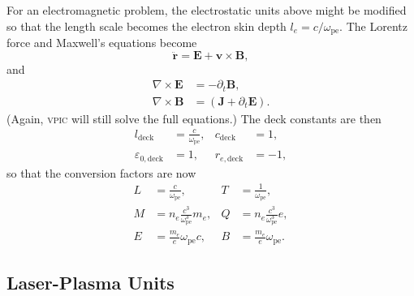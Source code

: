 \documentclass[twocolumn,10pt]{article}
\renewcommand{\vec}[1]{\mathbf{#1}}
\newcommand{\omegap}{\omega_{\mathrm{pe}}}
\begin{document}
	For an electromagnetic problem, the electrostatic units above might be modified so that the length scale becomes the electron skin depth $l_e=c/\omegap$. The Lorentz force and Maxwell's equations become
	\begin{equation*}
		\ddot{\vec{r}} = \vec{E} + \vec{v} \times \vec{B},
	\end{equation*}
	and
	\begin{align*}
		\nabla \times \vec{E} &= -\partial_t \vec{B}, \\
		\nabla \times \vec{B} &= \left(\vec{J} + \partial_t \vec{E}\right).
	\end{align*}
    (Again, \textsc{vpic} will still solve the full equations.)
	The deck constants are then
	\begin{align*}
		l_{\mathrm{deck}} &= \frac{c}{\omegap}, &
		c_{\mathrm{deck}} &= 1, \\
		\varepsilon_{0,\mathrm{deck}} &= 1, &
		r_{e,\mathrm{deck}} &= -1,
	\end{align*}
	so that the conversion factors are now
	\begin{align*}
		L &= \frac{c}{\omega_{\mathrm{pe}}}, &
		T &= \frac{1}{\omega_{\mathrm{pe}}}, \\
		M &= n_e\frac{c^3}{\omegap^3}m_e, &
		Q &= n_e\frac{c^3}{\omegap^3}e, \\
		E &= \frac{m_e}{e}\omegap c, &
		B &= \frac{m_e}{e}\omegap.
	\end{align*}

	\subsection{Laser-Plasma Units}
\end{document}
